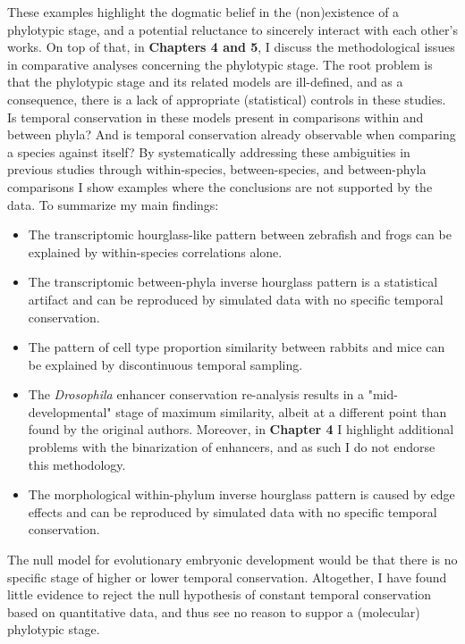 These examples highlight the dogmatic belief in the (non)existence of a phylotypic stage, and a potential reluctance to sincerely interact with each other's works. On top of that, in \textbf{Chapters 4 and 5}, I discuss the methodological issues in comparative analyses concerning the phylotypic stage. The root problem is that the phylotypic stage and its related models are ill-defined, and as a consequence, there is a lack of appropriate (statistical) controls in these studies. Is temporal conservation in these models present in comparisons within and between phyla? And is temporal conservation already observable when comparing a species against itself? By systematically addressing these ambiguities in previous studies through within-species, between-species, and between-phyla comparisons I show examples where the conclusions are not supported by the data. To summarize my main findings:
\begin{itemize}
    \item The transcriptomic hourglass-like pattern between zebrafish and frogs\cite{marletaz2018} can be explained by within-species correlations alone.
    \item The transcriptomic between-phyla inverse hourglass pattern\cite{Levin2016} is a statistical artifact and can be reproduced by simulated data with no specific temporal conservation.
    \item The pattern of cell type proportion similarity between rabbits and mice\cite{Mayshar2023} can be explained by discontinuous temporal sampling.
    \item The \textit{Drosophila} enhancer conservation re-analysis results in a "mid-developmental" stage of maximum similarity, albeit at a different point than found by the original authors. Moreover, in \textbf{Chapter 4} I highlight additional problems with the binarization of enhancers, and as such I do not endorse this methodology.
    \item  The morphological within-phylum inverse hourglass pattern is caused by edge effects and can be reproduced by simulated data with no specific temporal conservation.
\end{itemize}
\noindent
The null model for evolutionary embryonic development would be that there is no specific stage of higher or lower temporal conservation. Altogether, I have found little evidence to reject the null hypothesis of constant temporal conservation based on quantitative data, and thus see no reason to suppor a (molecular) phylotypic stage.

